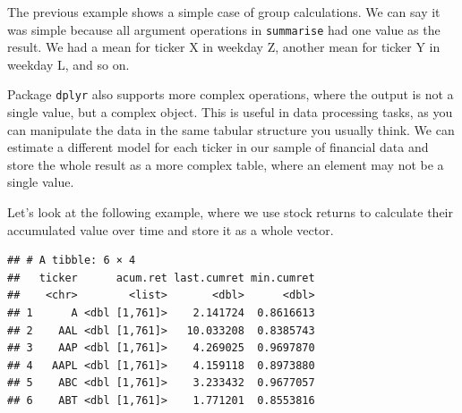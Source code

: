 \documentclass[11pt,]{book}
\newenvironment{Shaded}{\begin{snugshade}}{\end{snugshade}}
\newcommand{\KeywordTok}[1]{\textcolor[rgb]{0.27,0.27,0.27}{\textbf{#1}}}
\newcommand{\DataTypeTok}[1]{\textcolor[rgb]{0.27,0.27,0.27}{#1}}
\newcommand{\DecValTok}[1]{\textcolor[rgb]{0.06,0.06,0.06}{#1}}
\newcommand{\StringTok}[1]{\textcolor[rgb]{0.5,0.5,0.5}{#1}}
\newcommand{\CommentTok}[1]{\textcolor[rgb]{0.56,0.35,0.01}{\textit{#1}}}
\newcommand{\OperatorTok}[1]{\textcolor[rgb]{0.81,0.36,0.00}{\textbf{#1}}}
\newcommand{\NormalTok}[1]{#1}
\begin{document}
The previous example shows a simple case of group calculations. We can
say it was simple because all argument operations in \texttt{summarise}
had one value as the result. We had a mean for ticker X in weekday Z,
another mean for ticker Y in weekday L, and so on.

Package \texttt{dplyr} also supports more complex operations, where the
output is not a single value, but a complex object. This is useful in
data processing tasks, as you can manipulate the data in the same
tabular structure you usually think. We can estimate a different model
for each ticker in our sample of financial data and store the whole
result as a more complex table, where an element may not be a single
value.

Let's look at the following example, where we use stock returns to
calculate their accumulated value over time and store it as a whole
vector.

\begin{Shaded}
\end{Shaded}

\begin{verbatim}
## # A tibble: 6 × 4
##   ticker      acum.ret last.cumret min.cumret
##    <chr>        <list>       <dbl>      <dbl>
## 1      A <dbl [1,761]>    2.141724  0.8616613
## 2    AAL <dbl [1,761]>   10.033208  0.8385743
## 3    AAP <dbl [1,761]>    4.269025  0.9697870
## 4   AAPL <dbl [1,761]>    4.159118  0.8973880
## 5    ABC <dbl [1,761]>    3.233432  0.9677057
## 6    ABT <dbl [1,761]>    1.771201  0.8553816
\end{verbatim}
\end{document}
